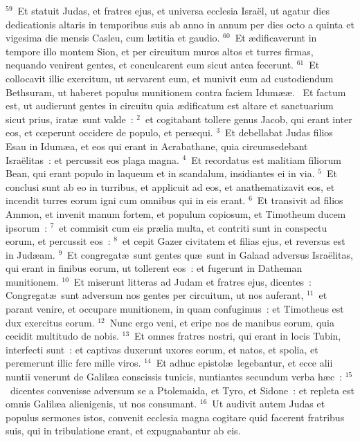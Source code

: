 ${}^{59}$~Et statuit Judas, et fratres ejus, et universa ecclesia Isra\"el, ut agatur dies dedicationis altaris in temporibus suis ab anno in annum per dies octo a quinta et vigesima die mensis Casleu, cum l\ae titia et gaudio.
${}^{60}$~Et \ae dificaverunt in tempore illo montem Sion, et per circuitum muros altos et turres firmas, nequando venirent gentes, et conculcarent eum sicut antea fecerunt.
${}^{61}$~Et collocavit illic exercitum, ut servarent eum, et munivit eum ad custodiendum Bethsuram, ut haberet populus munitionem contra faciem Idum\ae \ae .
~\lettrine[lines=10,image=true,loversize=0.05,lraise=-0.03]{E}{}t factum est, ut audierunt gentes in circuitu quia \ae dificatum est altare et sanctuarium sicut prius, irat\ae\ sunt valde~:
${}^{2}$~et cogitabant tollere genus Jacob, qui erant inter eos, et cœperunt occidere de populo, et persequi.
${}^{3}$~Et debellabat Judas filios Esau in Idum\ae a, et eos qui erant in Acrabathane, quia circumsedebant Isra\"elitas~: et percussit eos plaga magna.
${}^{4}$~Et recordatus est malitiam filiorum Bean, qui erant populo in laqueum et in scandalum, insidiantes ei in via.
${}^{5}$~Et conclusi sunt ab eo in turribus, et applicuit ad eos, et anathematizavit eos, et incendit turres eorum igni cum omnibus qui in eis erant.
${}^{6}$~Et transivit ad filios Ammon, et invenit manum fortem, et populum copiosum, et Timotheum ducem ipsorum~:
${}^{7}$~et commisit cum eis pr\ae lia multa, et contriti sunt in conspectu eorum, et percussit eos~:
${}^{8}$~et cepit Gazer civitatem et filias ejus, et reversus est in Jud\ae am.
${}^{9}$~Et congregat\ae\ sunt gentes qu\ae\ sunt in Galaad adversus Isra\"elitas, qui erant in finibus eorum, ut tollerent eos~: et fugerunt in Datheman munitionem.
${}^{10}$~Et miserunt litteras ad Judam et fratres ejus, dicentes~: Congregat\ae\ sunt adversum nos gentes per circuitum, ut nos auferant,
${}^{11}$~et parant venire, et occupare munitionem, in quam confugimus~: et Timotheus est dux exercitus eorum.
${}^{12}$~Nunc ergo veni, et eripe nos de manibus eorum, quia cecidit multitudo de nobis.
${}^{13}$~Et omnes fratres nostri, qui erant in locis Tubin, interfecti sunt~: et captivas duxerunt uxores eorum, et natos, et spolia, et peremerunt illic fere mille viros.
${}^{14}$~Et adhuc epistol\ae\ legebantur, et ecce alii nuntii venerunt de Galil\ae a conscissis tunicis, nuntiantes secundum verba h\ae c~:
${}^{15}$~dicentes convenisse adversum se a Ptolemaida, et Tyro, et Sidone~: et repleta est omnis Galil\ae a alienigenis, ut nos consumant.
${}^{16}$~Ut audivit autem Judas et populus sermones istos, convenit ecclesia magna cogitare quid facerent fratribus suis, qui in tribulatione erant, et expugnabantur ab eis.


